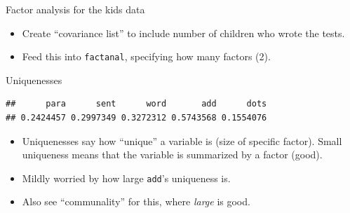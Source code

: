 \begin{frame}[fragile]{Factor analysis for the kids data}

  \begin{itemize}
  \item Create ``covariance list'' to include number of children who
    wrote the tests.
  \item Feed this into \texttt{factanal}, specifying how many factors (2).
  \end{itemize}
  
\begin{knitrout}
\color{fgcolor}\begin{kframe}
\begin{alltt}
\hlkwb{=}\hlstd{(}\hlstd{=}\hlstd{)}
\hlkwb{=}\hlstd{(}\hlstd{=}\hlstd{,}
\end{alltt}
\end{kframe}
\end{knitrout}

\end{frame}

\begin{frame}[fragile]{Uniquenesses}

\begin{knitrout}
\color{fgcolor}\begin{kframe}
\begin{alltt}
\hlopt{$}
\end{alltt}
\begin{verbatim}
##      para      sent      word       add      dots 
## 0.2424457 0.2997349 0.3272312 0.5743568 0.1554076
\end{verbatim}
\end{kframe}
\end{knitrout}

  \begin{itemize}
  \item Uniquenesses say how ``unique'' a variable is (size of
    specific factor). Small
    uniqueness means that the variable is summarized by a factor (good).
    
  \item Mildly worried by how large \texttt{add}'s uniqueness is.
  \item Also see ``communality'' for this, where \emph{large} is good.
  \end{itemize}
  
\end{frame}

